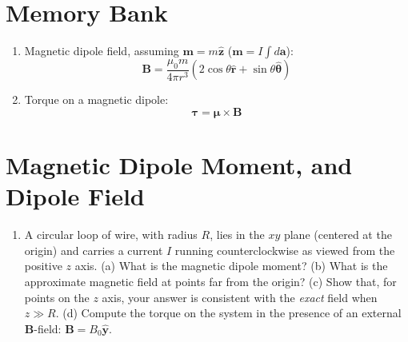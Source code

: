 \documentclass[12pt]{article}
\begin{document}
\maketitle
\small
\section{Memory Bank}
\begin{enumerate}
\item Magnetic dipole field, assuming $\mathbf{m} = m\hat{\mathbf{z}}$ ($\mathbf{m} = I\int d\mathbf{a}$):
\begin{equation}
\mathbf{B} = \frac{\mu_0 m}{4\pi r^3}\left(2\cos\theta \hat{\mathbf{r}} + \sin\theta \hat{\boldsymbol{\theta}}\right)
\end{equation}
\item Torque on a magnetic dipole:
\begin{equation}
\boldsymbol{\tau} = \boldsymbol{\mu} \times \mathbf{B}
\end{equation}
\end{enumerate}

\section{Magnetic Dipole Moment, and Dipole Field}

\begin{enumerate}
\item A circular loop of wire, with radius $R$, lies in the $xy$ plane (centered at the origin) and carries a current $I$ running counterclockwise as viewed from the positive $z$ axis. (a) What is the magnetic dipole moment? (b) What is the approximate magnetic field at points far from the origin? (c) Show that, for points on the $z$ axis, your answer is consistent with the \textit{exact} field when $z\gg R$. (d) Compute the torque on the system in the presence of an external $\mathbf{B}$-field: $\mathbf{B} = B_0 \hat{\mathbf{y}}$.
\end{enumerate}
\end{document}
